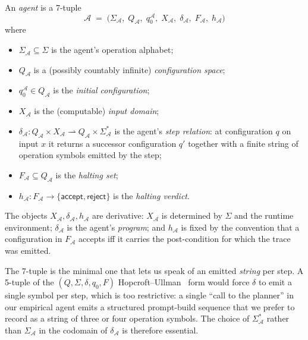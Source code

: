 \begin{definition}[Agent]
\label{def:agent}
An \emph{agent} is a 7-tuple
\[
\mathcal{A} \;=\; \bigl(\Sigma_\mathcal{A},\;
                       Q_\mathcal{A},\;
                       q_0^\mathcal{A},\;
                       X_\mathcal{A},\;
                       \delta_\mathcal{A},\;
                       F_\mathcal{A},\;
                       h_\mathcal{A}\bigr)
\]
where
\begin{itemize}
\item $\Sigma_\mathcal{A} \subseteq \Sigma$ is the agent's
operation alphabet;
\item $Q_\mathcal{A}$ is a (possibly countably infinite)
\emph{configuration space};
\item $q_0^\mathcal{A} \in Q_\mathcal{A}$ is the \emph{initial
configuration};
\item $X_\mathcal{A}$ is the (computable) \emph{input domain};
\item $\delta_\mathcal{A} : Q_\mathcal{A} \times X_\mathcal{A}
\rightharpoonup Q_\mathcal{A} \times \Sigma_\mathcal{A}^*$ is the
agent's \emph{step relation}: at configuration $q$ on input $x$
it returns a successor configuration $q'$ together with a finite
string of operation symbols emitted by the step;
\item $F_\mathcal{A} \subseteq Q_\mathcal{A}$ is the \emph{halting
set};
\item $h_\mathcal{A}: F_\mathcal{A} \to \{\textsf{accept},
\textsf{reject}\}$ is the \emph{halting verdict}.
\end{itemize}

The objects $X_\mathcal{A}, \delta_\mathcal{A}, h_\mathcal{A}$
are derivative: $X_\mathcal{A}$ is determined by $\Sigma$ and the
runtime environment; $\delta_\mathcal{A}$ is the agent's
\emph{program}; and $h_\mathcal{A}$ is fixed by the convention
that a configuration in $F_\mathcal{A}$ accepts iff it carries
the post-condition for which the trace was emitted.
\end{definition}

\begin{remark}
The 7-tuple is the minimal one that lets us speak of an emitted
\emph{string} per step.  A 5-tuple of the
$(Q,\Sigma,\delta,q_0,F)$ Hopcroft--Ullman~\cite{hopcroft2006automata}
form would force $\delta$ to emit a single symbol per step, which
is too restrictive: a single ``call to the planner'' in our
empirical agent emits a structured prompt-build sequence that we
prefer to record as a string of three or four operation symbols.
The choice of $\Sigma_\mathcal{A}^*$ rather than $\Sigma_\mathcal{A}$
in the codomain of $\delta_\mathcal{A}$ is therefore essential.
\end{remark}

